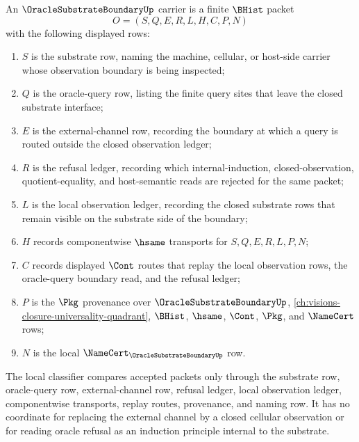 \begin{definition}
\label{def:oracle-substrate-boundary-carrier}
An $\OracleSubstrateBoundaryUp$ carrier is a finite $\BHist$ packet
$$
O=(S,Q,E,R,L,H,C,P,N)
$$
with the following displayed rows:
\begin{enumerate}
\item $S$ is the substrate row, naming the machine, cellular, or host-side carrier whose observation boundary is being inspected;
\item $Q$ is the oracle-query row, listing the finite query sites that leave the closed substrate interface;
\item $E$ is the external-channel row, recording the boundary at which a query is routed outside the closed observation ledger;
\item $R$ is the refusal ledger, recording which internal-induction, closed-observation, quotient-equality, and host-semantic reads are rejected for the same packet;
\item $L$ is the local observation ledger, recording the closed substrate rows that remain visible on the substrate side of the boundary;
\item $H$ records componentwise $\hsame$ transports for $S,Q,E,R,L,P,N$;
\item $C$ records displayed $\Cont$ routes that replay the local observation rows, the oracle-query boundary read, and the refusal ledger;
\item $P$ is the $\Pkg$ provenance over $\OracleSubstrateBoundaryUp$, \autoref{ch:visions-closure-universality-quadrant}, $\BHist$, $\hsame$, $\Cont$, $\Pkg$, and $\NameCert$ rows;
\item $N$ is the local $\NameCert_{\OracleSubstrateBoundaryUp}$ row.
\end{enumerate}
The local classifier compares accepted packets only through the substrate row, oracle-query row, external-channel row, refusal ledger, local observation ledger, componentwise transports, replay routes, provenance, and naming row. It has no coordinate for replacing the external channel by a closed cellular observation or for reading oracle refusal as an induction principle internal to the substrate.
\end{definition}


